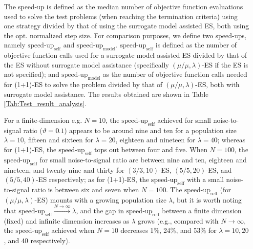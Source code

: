 The speed-up is defined as the median number of objective function evaluations used to solve the test problems (when reaching the termination criteria) using one strategy divided by that of using the surrogate model assisted ES, both using the opt. normalized step size. For comparison purposes, we define two speed-ups, namely $\text{speed-up}_{\text{self}}$ and $\text{speed-up}_{\text{model}}$. $\text{speed-up}_{\text{self}}$ is defined as the number of objective function calls used for a surrogate model assisted ES divided by that of the ES without surrogate model assistance (specifically $(\mu/\mu,\lambda)$-ES if the ES is not specified); and $\text{speed-up}_{\text{model}}$ as the number of objective function calls needed for (1+1)-ES to solve the problem divided by that of $(\mu/\mu,\lambda)$-ES, both with surrogate model assistance. The results obtained are shown in Table \ref{Tab:Test_result_analysis}.




For a finite-dimension e.g. $N=10$, the $\text{speed-up}_{\text{self}}$ achieved for small noise-to-signal ratio ($\vartheta=0.1$) appears to be around nine and ten for a population size $\lambda=10$, fifteen and sixteen for $\lambda = 20$, eighteen and nineteen for $\lambda=40$; whereas for (1+1)-ES, the $\text{speed-up}_{\text{self}}$ tops out between four and five. When $N=100$, the $\text{speed-up}_{\text{self}}$ for small noise-to-signal ratio are between nine and ten, eighteen and nineteen, and twenty-nine and thirty for $(3/3,10)$-ES, $(5/5,20)$-ES, and $(5/5,40)$-ES respectively; as for (1+1)-ES, the $\text{speed-up}_{\text{self}}$ with a small noise-to-signal ratio is between six and seven when $N=100$. The $\text{speed-up}_{\text{self}}$ (for $(\mu/\mu,\lambda)$-ES) mounts with a growing population size $\lambda$, but it is worth noting that $\text{speed-up}_{\text{self}} \overset{N \rightarrow \infty}{\rightarrow} \lambda$, and the gap in $\text{speed-up}_{\text{self}}$ between a finite dimension (fixed) and infinite dimension increases as $\lambda$ grows (e.g., compared with $N\rightarrow \infty$, the $\text{speed-up}_{\text{self}}$ achieved when $N=10$ decreases 1\%, 24\%, and 53\% for $\lambda=10,20$, and $40$ respectively).  

